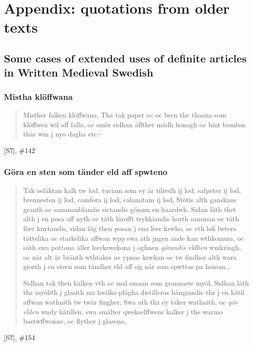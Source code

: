 
\chapter{Appendix: quotations from older texts}
\section{Some cases of extended uses of definite articles in Written Medieval Swedish}

 
\subsection*{Mistha klöffwana}
 
\begin{quotation}

Misther falken klöffwana, Tha tak paper oc  oc bren the thaana som klöffwen wil aff falla, oc smör sidhan äffther mädh honagh oc bint bombas thär wm j nyo dagha etc:-

\end{quotation}
[S7], \#142

\subsection*{Göra en sten som tänder eld aff spwteno} 
\begin{quotation}



Tak osläktan kalk tw lod, tuciam som ey är tilredh ij lod, salpeter ij lod, brennesten ij lod, camfora ij lod, calamitam ij lod, Stötis alth ganskans granth oc sammanblandis sictandis gönom en haardwk. Sidan läth thet alth j en posa aff nyth oc täth lärofft trykkiandis harth samman oc täth före knytandis, sidan läg then posan j ena leer krwko, oc eth lok lwtera tättelika oc starkelika affwan wpp swa ath jngen ande kan wthkomma, oc säth swa pottona äller leerkrwekona j oghnen \textit{görandis eldhen} wmkringh, oc när alt är bränth wthtakes oc ypnas krwkan oc tw findher alth wara giorth j en steen som tändher eld aff sig när som spwttas pa honom...

Sidhan tak then kalken vth oc mal smaan som grannaste myöl, Sidhan läth thz myölith j glasith mz hwilko plägha distilleras hängiandis thz j en kätil affwan wathnith tw twär fingher, Swa ath thz ey taker wathnith, oc \textit{gör elden} wndy kätillen, swa smälter qwekselffwens kalker j the warmo bastwffwonne, oc flyther j glaseno, 

\end{quotation}
[S7], \#154

